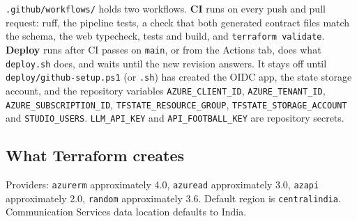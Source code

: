 \documentclass[11pt]{article}
\begin{document}
\texttt{.github/workflows/} holds two workflows.
\textbf{CI} runs on every push and pull request: ruff, the pipeline tests, a check
that both generated contract files match the schema, the web typecheck, tests and
build, and \texttt{terraform validate}.
\textbf{Deploy} runs after CI passes on \texttt{main}, or from the Actions tab, does
what \texttt{deploy.sh} does, and waits until the new revision answers.
It stays off until \texttt{deploy/github-setup.ps1} (or \texttt{.sh}) has created the
OIDC app, the state storage account, and the repository variables
\texttt{AZURE\_CLIENT\_ID}, \texttt{AZURE\_TENANT\_ID}, \texttt{AZURE\_SUBSCRIPTION\_ID},
\texttt{TFSTATE\_RESOURCE\_GROUP}, \texttt{TFSTATE\_STORAGE\_ACCOUNT} and \texttt{STUDIO\_USERS}.
\texttt{LLM\_API\_KEY} and \texttt{API\_FOOTBALL\_KEY} are repository secrets.

\begin{center}
\end{center}

\subsection{What Terraform creates}

Providers: \texttt{azurerm} approximately 4.0, \texttt{azuread} approximately 3.0,
\texttt{azapi} approximately 2.0, \texttt{random} approximately 3.6.
Default region is \texttt{centralindia}.
Communication Services data location defaults to India.
\end{document}
